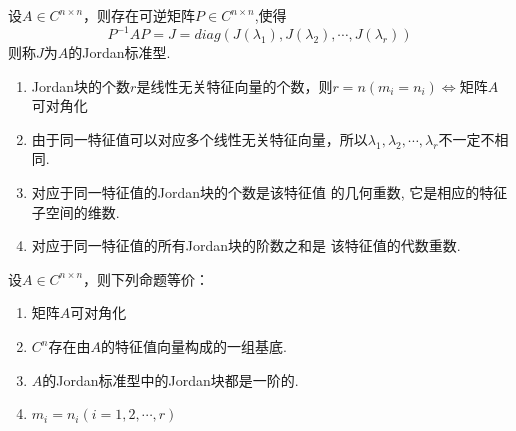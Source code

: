 \begin{theorem}
	设$A\in C^{n\times n}$，则存在可逆矩阵$P\in C^{n\times n}$,使得
	\[
	P^{-1}AP=J=diag\left(J(\lambda_1),J(\lambda_2),\cdots,J(\lambda_r)\right)
	\]
	则称$J$为$A$的Jordan标准型.
\end{theorem}
\begin{note}
	
\begin{enumerate}
	\item Jordan块的个数$r$是线性无关特征向量的个数，则$r=n(m_i=n_i)\Leftrightarrow 
	$矩阵$A$可对角化
	\item 由于同一特征值可以对应多个线性无关特征向量，所以$\lambda_1,\lambda_2,\cdots,\lambda_r$不一定不相同.
	\item  对应于同一特征值的Jordan块的个数是该特征值
	的几何重数, 它是相应的特征子空间的维数.
	\item  对应于同一特征值的所有Jordan块的阶数之和是
	该特征值的代数重数.
\end{enumerate}
\end{note}

\begin{theorem}
	设$A\in C^{n\times n}$，则下列命题等价：
	\begin{enumerate}
		\item 矩阵$A$可对角化
		\item $C^{n}$存在由$A$的特征值向量构成的一组基底.
		\item  $A$的Jordan标准型中的Jordan块都是一阶的.
		\item  $m_i=n_i(i=1,2,\cdots,r)$
	\end{enumerate}
\end{theorem}

